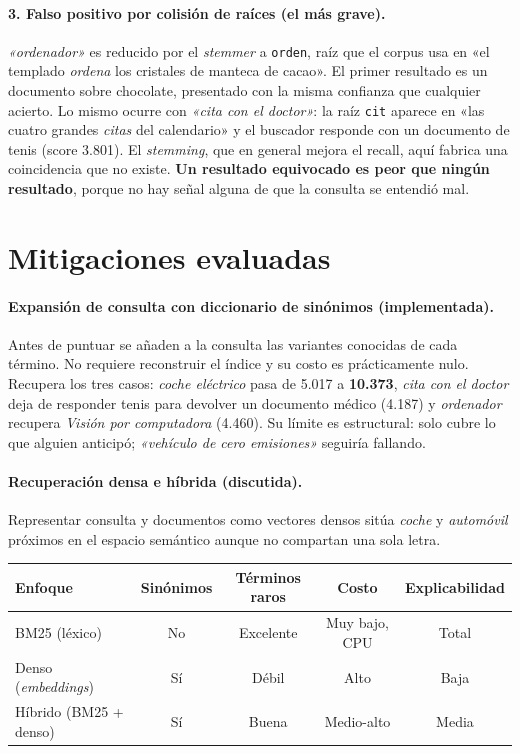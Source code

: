 \documentclass[10pt,a4paper]{article}
\newcommand{\term}[1]{\textcolor{acento}{\texttt{#1}}}
\begin{document}
\paragraph{3. Falso positivo por colisión de raíces (el más grave).} \emph{«ordenador»} es reducido
por el \emph{stemmer} a \term{orden}, raíz que el corpus usa en «el templado \emph{ordena} los
cristales de manteca de cacao». El primer resultado es un documento sobre chocolate, presentado con
la misma confianza que cualquier acierto. Lo mismo ocurre con \emph{«cita con el doctor»}: la raíz
\term{cit} aparece en «las cuatro grandes \emph{citas} del calendario» y el buscador responde con un
documento de tenis (score 3.801). El \emph{stemming}, que en general mejora el recall, aquí fabrica
una coincidencia que no existe. \textbf{Un resultado equivocado es peor que ningún resultado},
porque no hay señal alguna de que la consulta se entendió mal.

\section{Mitigaciones evaluadas}

\paragraph{Expansión de consulta con diccionario de sinónimos (implementada).} Antes de puntuar se
añaden a la consulta las variantes conocidas de cada término. No requiere reconstruir el índice y su
costo es prácticamente nulo. Recupera los tres casos: \emph{coche eléctrico} pasa de 5.017 a
\textbf{10.373}, \emph{cita con el doctor} deja de responder tenis para devolver un documento
médico (4.187) y \emph{ordenador} recupera \emph{Visión por computadora} (4.460). Su límite es
estructural: solo cubre lo que alguien anticipó; \emph{«vehículo de cero emisiones»} seguiría
fallando.

\paragraph{Recuperación densa e híbrida (discutida).} Representar consulta y documentos como
vectores densos sitúa \emph{coche} y \emph{automóvil} próximos en el espacio semántico aunque no
compartan una sola letra.

\begin{table}[h]
\centering\small
\begin{tabular}{@{}lcccc@{}}
\toprule
\textbf{Enfoque} & \textbf{Sinónimos} & \textbf{Términos raros} & \textbf{Costo} & \textbf{Explicabilidad} \\
\midrule
BM25 (léxico)            & No & Excelente & Muy bajo, CPU & Total \\
Denso (\emph{embeddings}) & Sí & Débil     & Alto          & Baja \\
Híbrido (BM25 + denso)   & Sí & Buena     & Medio-alto    & Media \\
\bottomrule
\end{tabular}
\end{table}
\end{document}
